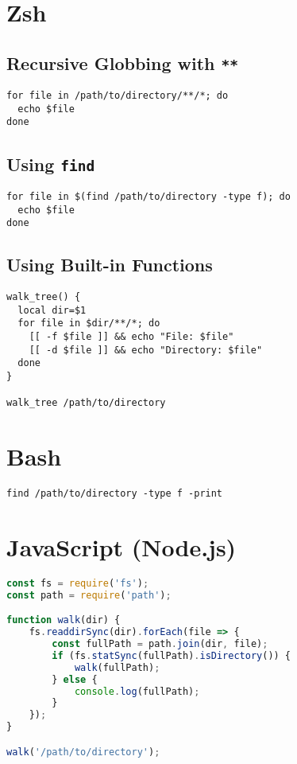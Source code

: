 \documentclass{article}
\begin{document}
\section{Zsh}
\subsection{Recursive Globbing with \texttt{**}}
\begin{lstlisting}
for file in /path/to/directory/**/*; do
  echo $file
done
\end{lstlisting}

\subsection{Using \texttt{find}}
\begin{lstlisting}
for file in $(find /path/to/directory -type f); do
  echo $file
done
\end{lstlisting}

\subsection{Using Built-in Functions}
\begin{lstlisting}
walk_tree() {
  local dir=$1
  for file in $dir/**/*; do
    [[ -f $file ]] && echo "File: $file"
    [[ -d $file ]] && echo "Directory: $file"
  done
}

walk_tree /path/to/directory
\end{lstlisting}

\section{Bash}
\begin{lstlisting}
find /path/to/directory -type f -print
\end{lstlisting}

\section{JavaScript (Node.js)}
\begin{lstlisting}[language=JavaScript]
const fs = require('fs');
const path = require('path');

function walk(dir) {
    fs.readdirSync(dir).forEach(file => {
        const fullPath = path.join(dir, file);
        if (fs.statSync(fullPath).isDirectory()) {
            walk(fullPath);
        } else {
            console.log(fullPath);
        }
    });
}

walk('/path/to/directory');
\end{lstlisting}
\end{document}
